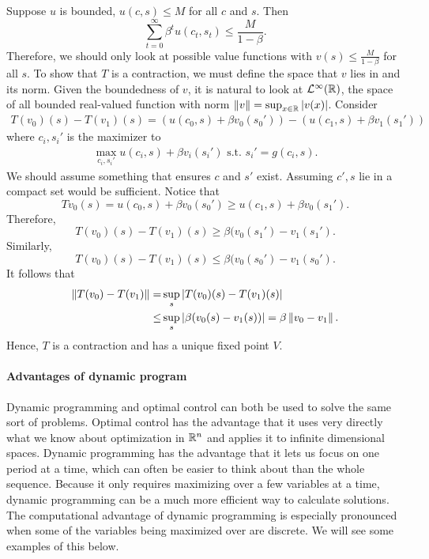 Suppose $u$ is bounded, $u(c,s) \leq M$ for all $c$ and $s$. Then 
\[ \sum_{t=0}^\infty \beta^t u(c_t,s_t)  \leq \frac{M}{1-\beta}. \]
Therefore, we should only look at possible value functions with $v(s)
\leq \frac{M}{1-\beta}$ for all $s$. To show that $T$ is a
contraction, we must define the space that $v$ lies in and its
norm. Given the boundedness of $v$, it is natural to look at
$\mathcal{L}^\infty(\mathbb{R})$, the space of all bounded real-valued function
with norm $\left\Vert {v} \right\Vert = \sup_{x \in \mathbb{R}} |v(x)|$. Consider
\begin{align*}
  T(v_0)(s)-T(v_1)(s) =  \left(u(c_0,s) + \beta v_0(s_0')  \right) -
  \left(u(c_1,s) + \beta v_1(s_1')  \right)
\end{align*} 
where $c_i,s_i'$ is the maximizer to 
\begin{align*}
  \max_{c_i,s_i'} u(c_i,s) + \beta v_i(s_i') \text{ s.t. }
  s_i'=g(c_i,s).
\end{align*}
We should assume something that ensures $c$ and $s'$ exist. Assuming
$c',s$ lie in a compact set would be sufficient. Notice that
\[ T v_0 (s) = u(c_0,s) + \beta v_0(s_0')  \geq u(c_1,s) + \beta
v_0(s_1'). \]
Therefore,
\[ T(v_0)(s) - T(v_1)(s) \geq \beta (v_0(s_1') - v_1(s_1'). \]
Similarly,
\[ T(v_0)(s)-T(v_1)(s) \leq \beta (v_0(s_0') - v_1(s_0'). \]
It follows that
\begin{align*}
  \left\Vert {T(v_0)-T(v_1)} \right\Vert = & \sup_{s} \left\vert T(v_0)(s)-T(v_1)(s) \right\vert \\
  \leq & \sup_s \left\vert \beta(v_0(s) -v_1(s)) \right\vert = \beta
  \left\Vert {v_0 - v_1} \right\Vert.
\end{align*}
Hence, $T$ is a contraction and has a unique fixed point $V$. 

\paragraph{Advantages of dynamic program} 
Dynamic programming and optimal control can both be used to solve the
same sort of problems. Optimal control has the advantage that it uses
very directly what we know about optimization in $\mathbb{R}^n$ and applies it
to infinite dimensional spaces. Dynamic programming has the advantage
that it lets us focus on one period at a time, which can often be
easier to think about than the whole sequence. Because it only
requires maximizing over a few variables at a time, dynamic
programming can be a much more efficient way to calculate
solutions. The computational advantage of dynamic programming is
especially pronounced when some of the variables being maximized over
are discrete. We will see some examples of this below. 

